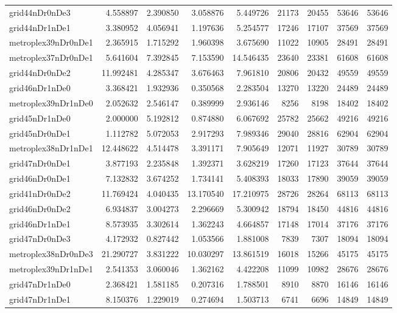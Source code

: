 \begin{longtable}{|l|r|r|r|r|r|r|r|r|}
grid44nDr0nDe3 & 4.558897 & 2.390850 & 3.058876 & 5.449726 & 21173 & 20455 & 53646 & 53646 \\
grid44nDr1nDe1 & 3.380952 & 4.056941 & 1.197636 & 5.254577 & 17246 & 17107 & 37569 & 37569 \\
metroplex39nDr0nDe1 & 2.365915 & 1.715292 & 1.960398 & 3.675690 & 11022 & 10905 & 28491 & 28491 \\
metroplex37nDr0nDe1 & 5.641604 & 7.392845 & 7.153590 & 14.546435 & 23640 & 23381 & 61608 & 61608 \\
grid44nDr0nDe2 & 11.992481 & 4.285347 & 3.676463 & 7.961810 & 20806 & 20432 & 49559 & 49559 \\
grid46nDr1nDe0 & 3.368421 & 1.932936 & 0.350568 & 2.283504 & 13270 & 13220 & 24489 & 24489 \\
metroplex39nDr1nDe0 & 2.052632 & 2.546147 & 0.389999 & 2.936146 & 8256 & 8198 & 18402 & 18402 \\
grid45nDr1nDe0 & 2.000000 & 5.192812 & 0.874880 & 6.067692 & 25782 & 25662 & 49216 & 49216 \\
grid45nDr0nDe1 & 1.112782 & 5.072053 & 2.917293 & 7.989346 & 29040 & 28816 & 62904 & 62904 \\
metroplex38nDr1nDe1 & 12.448622 & 4.514478 & 3.391171 & 7.905649 & 12071 & 11927 & 30789 & 30789 \\
grid47nDr0nDe1 & 3.877193 & 2.235848 & 1.392371 & 3.628219 & 17260 & 17123 & 37644 & 37644 \\
grid46nDr0nDe1 & 7.132832 & 3.674252 & 1.734141 & 5.408393 & 18033 & 17890 & 39059 & 39059 \\
grid41nDr0nDe2 & 11.769424 & 4.040435 & 13.170540 & 17.210975 & 28726 & 28264 & 68113 & 68113 \\
grid46nDr0nDe2 & 6.934837 & 3.004273 & 2.296669 & 5.300942 & 18794 & 18450 & 44816 & 44816 \\
grid46nDr1nDe1 & 8.573935 & 3.302614 & 1.362243 & 4.664857 & 17148 & 17014 & 37176 & 37176 \\
grid47nDr0nDe3 & 4.172932 & 0.827442 & 1.053566 & 1.881008 & 7839 & 7307 & 18094 & 18094 \\
metroplex38nDr0nDe3 & 21.290727 & 3.831222 & 10.030297 & 13.861519 & 16018 & 15266 & 45175 & 45175 \\
metroplex39nDr1nDe1 & 2.541353 & 3.060046 & 1.362162 & 4.422208 & 11099 & 10982 & 28676 & 28676 \\
grid47nDr1nDe0 & 2.368421 & 1.581185 & 0.207316 & 1.788501 & 8910 & 8870 & 16146 & 16146 \\
grid47nDr1nDe1 & 8.150376 & 1.229019 & 0.274694 & 1.503713 & 6741 & 6696 & 14849 & 14849 \\

\end{longtable}
